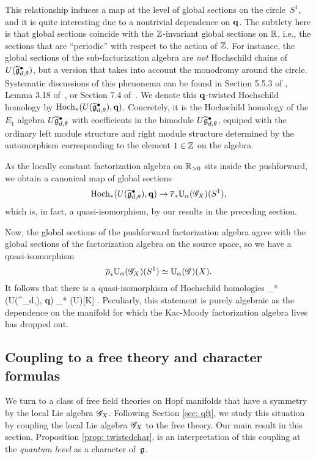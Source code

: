 This relationship induces a map at the level of global sections on the circle~$S^1$,
and it is quite interesting due to a nontrivial dependence on ${\bf q}$.
The subtlety here is that global sections coincide with the $\mathbb Z$-invariant global sections on $\mathbb R$, 
i.e., the sections that are ``periodic'' with respect to the action of $\mathbb Z$.
For instance, the global sections of the sub-factorization algebra are {\em not} Hochschild chains of $U(\widetilde{\mathfrak g}^\bullet_{d,\theta})$, 
but a version that takes into account the monodromy around the circle.
Systematic discussions of this phenonema can be found in Section 5.5.3 of \cite{LurieHA}, Lemma 3.18 of~\cite{AFTopMan}, or Section 7.4 of~\cite{CG1}.
We denote this ${\bf q}$-twisted Hochschild homology by ${\rm Hoch}_*(U(\widetilde{\mathfrak g}^\bullet_{d,\theta}), {\bf q})$.
Concretely, it is the Hochschild homology of the $E_1$ algebra $U \widetilde{\mathfrak g}_{d,\theta}^\bullet$ with coefficients in the bimodule $U \widetilde{\mathfrak g}_{d, \theta}^\bullet$, equiped with the ordinary left module structure and right module structure determined by the automorphism corresponding to the element $1 \in \mathbb Z$ on the algebra.

As the locally constant factorization algebra on $\mathbb R_{>0}$ sits inside the pushforward, 
we obtain a canonical map of global sections
\[
{\rm Hoch}_*(U(\widetilde{\mathfrak g}^\bullet_{d,\theta}), {\bf q}) \to \overline{r}_* \mathbb U_\alpha(\mathscr G_X) (S^1) ,
\]
which is, in fact, a quasi-isomorphism, by our results in the preceding section. 

Now, the global sections of the pushforward factorization algebra agree with the global sections of the factorization algebra on the source space,
so we have a quasi-isomorphism
\[
\overline{\rho}_* \mathbb U_\alpha(\mathscr G_X) (S^1) \simeq \mathbb U_{\alpha} (\mathscr G)(X) .
\]
It follows that there is a quasi-isomorphism of Hochschild homologies
\beqn\label{hoch1}
\Hoch_*(U(\Tilde{\fg}^\bullet_{d,\theta}), {\bf q}) \simeq \Hoch_* (U\fg)[K] .
\eeqn
Peculiarly, this statement is purely algebraic as the dependence on the manifold for which the Kac-Moody factorization algebra lives has dropped out.

\subsection{Coupling to a free theory and character formulas}

\def\Cl{{\rm Cl}}

We turn to a class of free field theories on Hopf manifolds that have a symmetry by the local Lie algebra $\mathscr G_X$. 
Following Section \ref{sec: qft}, we study this situation by coupling the local Lie algebra $\mathscr G_X$ to the free theory.
Our main result in this section, Proposition \ref{prop: twistedchar}, is an interpretation of this coupling at the {\em quantum level} as a character of~$\mathfrak g$. 


